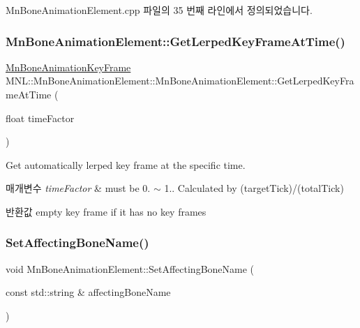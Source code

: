 Mn\+Bone\+Animation\+Element.\+cpp 파일의 35 번째 라인에서 정의되었습니다.

\mbox{\label{class_m_n_l_1_1_mn_bone_animation_element_ab689fa5a0df4c1d6a601baa13759d10d}} 
\subsubsection{\texorpdfstring{Mn\+Bone\+Animation\+Element\+::\+Get\+Lerped\+Key\+Frame\+At\+Time()}{MnBoneAnimationElement::GetLerpedKeyFrameAtTime()}}
{\footnotesize\ttfamily \hyperlink{struct_m_n_l_1_1_mn_bone_animation_key_frame}{Mn\+Bone\+Animation\+Key\+Frame} M\+N\+L\+::\+Mn\+Bone\+Animation\+Element\+::\+Mn\+Bone\+Animation\+Element\+::\+Get\+Lerped\+Key\+Frame\+At\+Time (\begin{DoxyParamCaption}\item[{float}]{time\+Factor }\end{DoxyParamCaption})}

Get automatically lerped key frame at the specific time. 
\begin{DoxyParams}{매개변수}
{\em time\+Factor} & must be 0. $\sim$ 1.. Calculated by (target\+Tick)/(total\+Tick) \\
\hline
\end{DoxyParams}
\begin{DoxyReturn}{반환값}
empty key frame if it has no key frames 
\end{DoxyReturn}
\mbox{\label{class_m_n_l_1_1_mn_bone_animation_element_a9e9864a75d577193b3e39ce56838c43c}} 
\subsubsection{\texorpdfstring{Set\+Affecting\+Bone\+Name()}{SetAffectingBoneName()}}
{\footnotesize\ttfamily void Mn\+Bone\+Animation\+Element\+::\+Set\+Affecting\+Bone\+Name (\begin{DoxyParamCaption}\item[{const std\+::string \&}]{affecting\+Bone\+Name }\end{DoxyParamCaption})}



